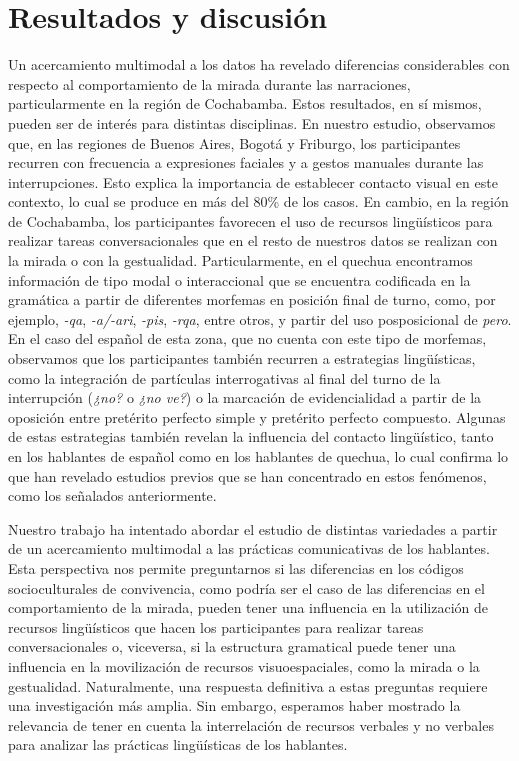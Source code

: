\documentclass[output=paper]{../langscibook}
\begin{document}
\section{Resultados y discusión}\label{sec:satti:5}

Un acercamiento multimodal a los datos ha revelado diferencias considerables con respecto al comportamiento de la mirada durante las narraciones, particularmente en la región de Cochabamba. Estos resultados, en sí mismos, pueden ser de interés para distintas disciplinas. En nuestro estudio, observamos que, en las regiones de Buenos Aires, Bogotá y Friburgo, los participantes recurren con frecuencia a expresiones faciales y a gestos manuales durante las interrupciones. Esto explica la importancia de establecer contacto visual en este contexto, lo cual se produce en más del 80\% de los casos. En cambio, en la región de Cochabamba, los participantes favorecen el uso de recursos lingüísticos para realizar tareas conversacionales que en el resto de nuestros datos se realizan con la mirada o con la gestualidad. Particularmente, en el quechua encontramos información de tipo modal o interaccional que se encuentra codificada en la gramática a partir de diferentes morfemas en posición final de turno, como, por ejemplo, \textit{{}-qa}, \textit{{}-a/-ari}, \textit{{}-pis}, \textit{{}-rqa}, entre otros, y partir del uso posposicional de \textit{pero}. En el caso del español de esta zona, que no cuenta con este tipo de morfemas, observamos que los participantes también recurren a estrategias lingüísticas, como la integración de partículas interrogativas al final del turno de la interrupción (\textit{¿no?} o \textit{¿no ve?}) o la marcación de evidencialidad a partir de la oposición entre pretérito perfecto simple y pretérito perfecto compuesto. Algunas de estas estrategias también revelan la influencia del contacto lingüístico, tanto en los hablantes de español como en los hablantes de quechua, lo cual confirma lo que han revelado estudios previos que se han concentrado en estos fenómenos, como los señalados anteriormente.

Nuestro trabajo ha intentado abordar el estudio de distintas variedades a partir de un acercamiento multimodal a las prácticas comunicativas de los hablantes. Esta perspectiva nos permite preguntarnos si las diferencias en los códigos socioculturales de convivencia, como podría ser el caso de las diferencias en el comportamiento de la mirada, pueden tener una influencia en la utilización de recursos lingüísticos que hacen los participantes para realizar tareas conversacionales o, viceversa, si la estructura gramatical puede tener una influencia en la movilización de recursos visuoespaciales, como la mirada o la gestualidad. Naturalmente, una respuesta definitiva a estas preguntas requiere una investigación más amplia. Sin embargo, esperamos haber mostrado la relevancia de tener en cuenta la interrelación de recursos verbales y no verbales para analizar las prácticas lingüísticas de los hablantes.
\end{document}
